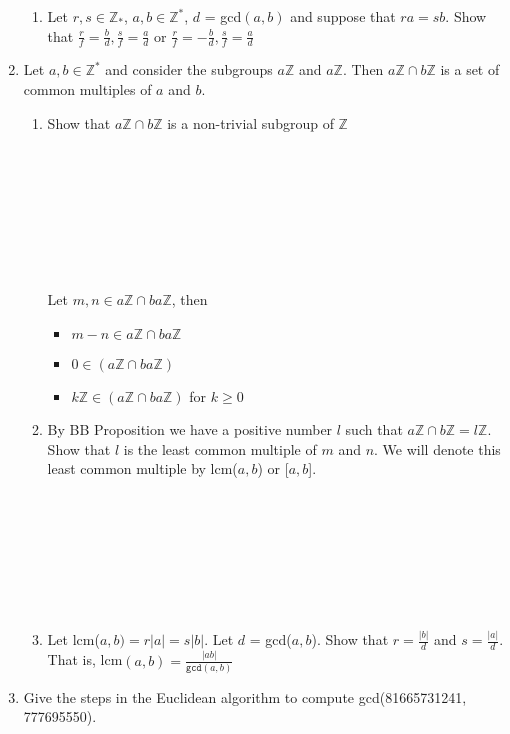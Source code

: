 \documentclass[11pt]{article}
\begin{document}
\begin{enumerate}
\begin{enumerate}
\item Let $r,s \in \mathbb{Z}_*$, $a,b \in \mathbb{Z}^*$, $d$ = gcd$(a,b)$ and suppose that $ra = sb$.  Show that $\tfrac{r}{f} = \tfrac{b}{d}, \tfrac{s}{f} = \tfrac{a}{d}$ or $\tfrac{r}{f} = -\tfrac{b}{d}, \tfrac{s}{f}=\tfrac{a}{d}$
\end{enumerate}


\newpage %
\item Let $a, b \in \mathbb{Z}^*$ and consider the subgroups $a\mathbb{Z}$ and $a\mathbb{Z}$.  Then $a\mathbb{Z} \cap b\mathbb{Z}$ is a set of common multiples of $a$ and $b$.
\begin{enumerate}
\item Show that $a\mathbb{Z} \cap b\mathbb{Z}$ is a non-trivial subgroup of $\mathbb{Z}$
\\\\
\\
\\
\\
\\
\\
\\
\\
Let $m,n \in a\mathbb{Z} \cap ba\mathbb{Z}$, then
\begin{itemize}
  \item $m-n \in a\mathbb{Z} \cap ba\mathbb{Z}$
  \item $0 \in (a\mathbb{Z} \cap ba\mathbb{Z})$
  \item $k\mathbb{Z} \in (a\mathbb{Z} \cap ba\mathbb{Z})$ for $k \geq 0$
\end{itemize}
\item By BB Proposition we have a positive number $l$ such that $a\mathbb{Z} \cap b\mathbb{Z} = l\mathbb{Z}$.  Show that $l$ is the least common multiple of $m$ and $n$.  We will denote this least common multiple by lcm($a,b$) or [$a,b$].
\\
\\
\\\\
\\
\\
\\
\\

\item Let lcm($a,b) = r|a| = s|b|$.  Let $d$ = gcd($a,b$).  Show that $r = \tfrac{|b|}{d}$ and $s = \tfrac{|a|}{d}$.  That is, lcm$(a,b) = \tfrac{|ab|}{\mathtt{gcd}(a,b)}$
\end{enumerate}


\newpage %
\item Give the steps in the Euclidean algorithm to compute gcd(81665731241, 777695550).


\end{enumerate}
\end{document}
